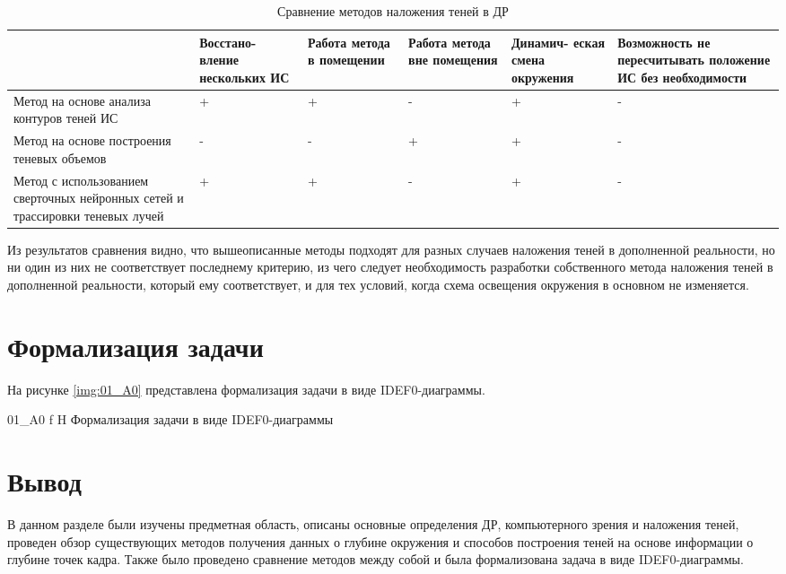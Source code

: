 \begin{table}[H]
	\caption{Сравнение методов наложения теней в ДР}
	\label{class}
	\begin{center}
		\begin{tabular}{| p{3.25 cm} | p{2 cm} | p{2 cm} | p{2 cm} | p{2 cm} | p{2.75 cm} |} 
			\hline
			& Восстано- вление нескольких ИС & Работа метода в помещении & Работа метода вне помещения & Динамич- еская смена окружения & Возможность не пересчитывать положение ИС без необходимости \\
			\hline
			Метод на основе анализа контуров теней ИС & + & + & - & + & - \\
			\hline
			Метод на основе построения теневых объемов & - & - & + & + & - \\
			\hline
			Метод с использованием сверточных нейронных сетей и трассировки теневых лучей & + & + & - & + & - \\
			\hline
		\end{tabular}
	\end{center}
\end{table}

Из результатов сравнения видно, что вышеописанные методы подходят для разных случаев наложения теней в дополненной реальности, но ни один из них не соответствует последнему критерию, из чего следует необходимость разработки собственного метода наложения теней в дополненной реальности, который ему соответствует, и для тех условий, когда схема освещения окружения в основном не изменяется.

\section{Формализация задачи}

На рисунке \ref{img:01_A0} представлена формализация задачи в виде IDEF0-диаграммы.

{01_A0}
{f}
{H}
{\textwidth}
{Формализация задачи в виде IDEF0-диаграммы}

\section*{Вывод}

В данном разделе были изучены предметная область, описаны основные определения ДР, компьютерного зрения и наложения теней, проведен обзор существующих методов получения данных о глубине окружения и способов построения теней на основе информации о глубине точек кадра. Также было проведено сравнение методов между собой и была формализована задача в виде IDEF0-диаграммы.